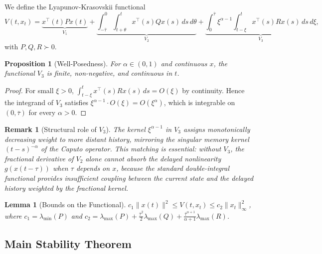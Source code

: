 \documentclass[12pt,a4paper]{article}
\newtheorem{lemma}[theorem]{Lemma}
\newtheorem{proposition}[theorem]{Proposition}
\newtheorem{remark}{Remark}
\begin{document}
We define the Lyapunov-Krasovskii functional
\begin{equation}
\label{eq:lyapunov_functional}
    V(t, x_t) = \underbrace{x^{\!\top}(t) P x(t)}_{V_1} + \underbrace{\int_{-\bar{\tau}}^{0} \int_{t+\theta}^{t} x^{\!\top}(s) Q x(s) \, ds \, d\theta}_{V_2} + \underbrace{\int_{0}^{\bar{\tau}} \xi^{\alpha-1} \int_{t-\xi}^{t} x^{\!\top}(s) R x(s) \, ds \, d\xi}_{V_3},
\end{equation}
with $P, Q, R \succ 0$.

\begin{proposition}[Well-Posedness]
\label{prop:wellposed}
For $\alpha \in (0,1)$ and continuous $x$, the functional $V_3$ is finite, non-negative, and continuous in $t$.
\end{proposition}

\begin{proof}
For small $\xi > 0$, $\int_{t-\xi}^{t} x^{\!\top}(s) R x(s)\, ds = O(\xi)$ by continuity. Hence the integrand of $V_3$ satisfies $\xi^{\alpha-1} \cdot O(\xi) = O(\xi^{\alpha})$, which is integrable on $(0, \bar{\tau})$ for every $\alpha > 0$.
\end{proof}

\begin{remark}[Structural role of $V_3$]
The kernel $\xi^{\alpha-1}$ in $V_3$ assigns monotonically decreasing weight to more distant history, mirroring the singular memory kernel $(t-s)^{-\alpha}$ of the Caputo operator. This matching is essential: without $V_3$, the fractional derivative of $V_2$ alone cannot absorb the delayed nonlinearity $g(x(t-\tau))$ when $\tau$ depends on $x$, because the standard double-integral functional provides insufficient coupling between the current state and the delayed history weighted by the fractional kernel.
\end{remark}

\begin{lemma}[Bounds on the Functional]
\label{lem:lkf_bounds}
$c_1 \|x(t)\|^2 \leq V(t, x_t) \leq c_2 \|x_t\|_{\infty}^2$, where $c_1 = \lambda_{\min}(P)$ and $c_2 = \lambda_{\max}(P) + \frac{\bar{\tau}^2}{2}\lambda_{\max}(Q) + \frac{\bar{\tau}^{\alpha+1}}{\alpha+1}\lambda_{\max}(R)$.
\end{lemma}

\subsection{Main Stability Theorem}
\end{document}
